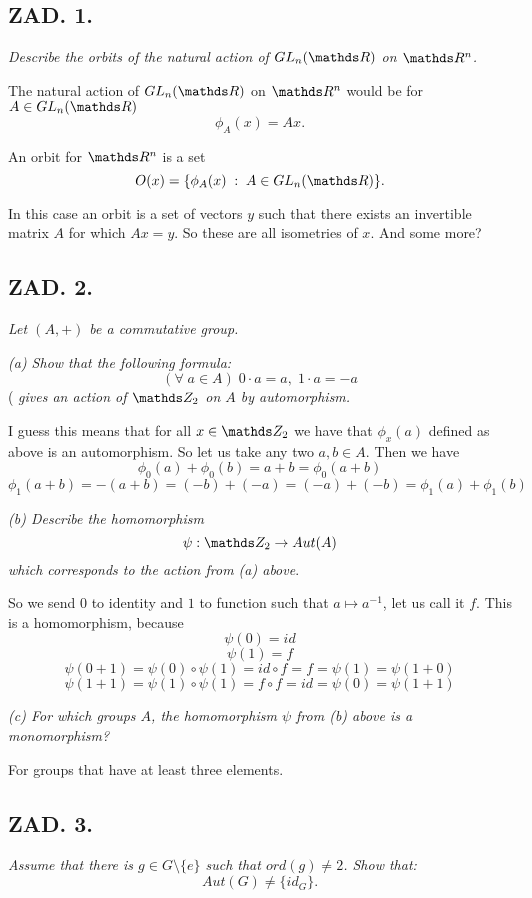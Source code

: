\documentclass{article}[13pt]
\begin{document}
\subsection*{ZAD. 1.}
\emph{Describe the orbits of the natural action of $GL_n(\R)$ on $\R^n$.}
\medskip

The natural action of $GL_n(\R)$ on $\R^n$ would be for $A\in GL_n(\R)$
$$\phi_A(x)=Ax.$$

An orbit for $\R^n$ is a set
$$O(x)=\{\phi_A(x)\;:\;A\in GL_n(\R)\}.$$

In this case an orbit is a set of vectors $y$ such that there exists an invertible matrix $A$ for which $Ax=y$. So these are all isometries of $x$. {\color{acc}And some more?}

\subsection*{ZAD. 2.}

\emph{Let $(A, +)$ be a commutative group.}

\emph{{\color{acc}(a)} Show that the following formula:}
$$(\forall\;a\in A)\;0\cdot a=a,\;1\cdot a=-a$$(
\emph{gives an action of $\Z_2$ on $A$ by automorphism.}
\medskip

I guess this means that for all $x\in \Z_2$ we have that $\phi_x(a)$ defined as above is an automorphism. So let us take any two $a,b\in A$. Then we have
$$\phi_0(a)+\phi_0(b)=a+b=\phi_0(a+b)$$
$$\phi_1(a+b)=-(a+b)=(-b)+(-a)=(-a)+(-b)=\phi_1(a)+\phi_1(b)$$

\emph{{\color{acc}(b)} Describe the homomorphism}
$$\psi:\Z_2\to Aut(A)$$
\emph{which corresponds to the action from (a) above}.
\medskip

So we send $0$ to identity and $1$ to function such that $a\mapsto a^{-1}$, let us call it $f$. This is a homomorphism, because
$$\psi(0)=id$$
$$\psi(1)=f$$
$$\psi(0+1)=\psi(0)\circ\psi(1)=id\circ f=f=\psi(1)=\psi(1+0)$$
$$\psi(1+1)=\psi(1)\circ\psi(1)=f\circ f=id=\psi(0)=\psi(1+1)$$

\emph{{\color{acc}(c)} For which groups $A$, the homomorphism $\psi$ from (b) above is a monomorphism?}
\medskip

For groups that have at least three elements.

\subsection*{ZAD. 3.}

\emph{Assume that there is $g\in G\setminus\{e\}$ such that $ord(g)\neq 2$. Show that:}
$$Aut(G)\neq \{id_G\}.$$
\end{document}
